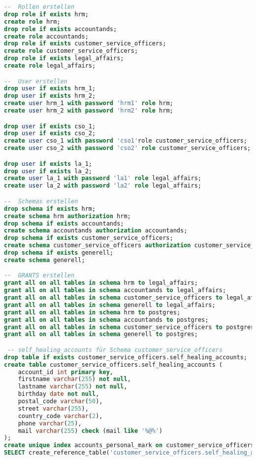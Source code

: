 \begin{lstlisting}[language=sql, caption=StackGres-Citus - Self Healing Tests - CREATE-SQL,captionpos=b,label={stackgres_citus-self-healing-create-sql},breaklines=true]
--  Rollen erstellen
drop role if exists hrm;
create role hrm;
drop role if exists accountands;
create role accountands;
drop role if exists customer_service_officers;
create role customer_service_officers;
drop role if exists legal_affairs;
create role legal_affairs;

--  User erstellen
drop user if exists hrm_1;
drop user if exists hrm_2;
create user hrm_1 with password 'hrm1' role hrm;
create user hrm_2 with password 'hrm2' role hrm;

drop user if exists cso_1;
drop user if exists cso_2;
create user cso_1 with password 'cso1'role customer_service_officers;
create user cso_2 with password 'cso2' role customer_service_officers;

drop user if exists la_1;
drop user if exists la_2;
create user la_1 with password 'la1' role legal_affairs;
create user la_2 with password 'la2' role legal_affairs;

--  Schemas erstellen
drop schema if exists hrm;
create schema hrm authorization hrm;
drop schema if exists accountands;
create schema accountands authorization accountands;
drop schema if exists customer_service_officers;
create schema customer_service_officers authorization customer_service_officers;
drop schema if exists generell;
create schema generell;

--  GRANTS erstellen
grant all on all tables in schema hrm to legal_affairs;
grant all on all tables in schema accountands to legal_affairs;
grant all on all tables in schema customer_service_officers to legal_affairs;
grant all on all tables in schema generell to legal_affairs;
grant all on all tables in schema hrm to postgres;
grant all on all tables in schema accountands to postgres;
grant all on all tables in schema customer_service_officers to postgres;
grant all on all tables in schema generell to postgres;

 -- self_healing_accounts für Schema customer_service_officers
drop table if exists customer_service_officers.self_healing_accounts;
create table customer_service_officers.self_healing_accounts (
    account_id int primary key,
    firstname varchar(255) not null,
    lastname varchar(255) not null,
    birthday date not null,
    postal_code varchar(50),
    street varchar(255),
    country_code varchar(2),
    phone varchar(25),
    mail varchar(255) check (mail like '%@%')
);
create unique index accounts_personal_mark on customer_service_officers.self_healing_accounts(firstname, lastname, birthday);
SELECT create_reference_table('customer_service_officers.self_healing_accounts');


\end{lstlisting}
